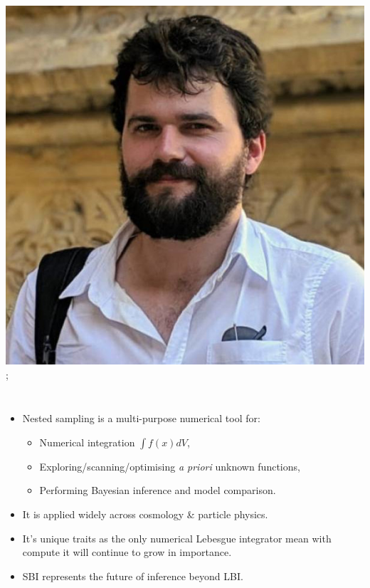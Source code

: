 \documentclass[aspectratio=169]{beamer}
\begin{document}
\begin{frame}
{        \includegraphics[width=0.10\textheight]{people/will_handley.jpg}%
    };
    \vspace{-0.1\textheight}
    \begin{columns}
    \begin{itemize}
        \item Nested sampling is a multi-purpose numerical tool for:
            \begin{itemize}
                \item Numerical integration $\int f(x) dV$,
                \item Exploring/scanning/optimising \textit{a priori} unknown functions,
                \item Performing Bayesian inference and model comparison.
            \end{itemize}
        \item It is applied widely across cosmology \& particle physics.
        \item It's unique traits as the only numerical Lebesgue integrator mean with compute it will continue to grow in importance.
        \item SBI represents the future of inference beyond LBI.
    \end{itemize}

\end{columns}
\end{frame}
\end{document}
